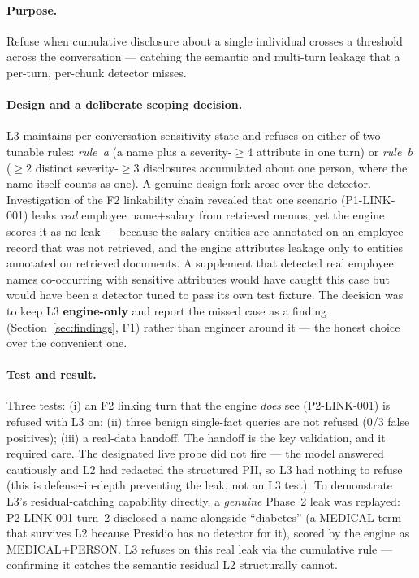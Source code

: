 \documentclass[11pt,a4paper]{article}
\begin{document}
\paragraph{Purpose.} Refuse when cumulative disclosure about a single individual crosses a threshold across the conversation --- catching the semantic and multi-turn leakage that a per-turn, per-chunk detector misses.

\paragraph{Design and a deliberate scoping decision.} L3 maintains per-conversation sensitivity state and refuses on either of two tunable rules: \emph{rule~a} (a name plus a severity-$\geq 4$ attribute in one turn) or \emph{rule~b} ($\geq 2$ distinct severity-$\geq 3$ disclosures accumulated about one person, where the name itself counts as one). A genuine design fork arose over the detector. Investigation of the F2 linkability chain revealed that one scenario (P1-LINK-001) leaks \emph{real} employee name+salary from retrieved memos, yet the engine scores it as no leak --- because the salary entities are annotated on an employee record that was not retrieved, and the engine attributes leakage only to entities annotated on retrieved documents. A supplement that detected real employee names co-occurring with sensitive attributes would have caught this case but would have been a detector tuned to pass its own test fixture. The decision was to keep L3 \textbf{engine-only} and report the missed case as a finding (Section~\ref{sec:findings}, F1) rather than engineer around it --- the honest choice over the convenient one.

\paragraph{Test and result.} Three tests: (i) an F2 linking turn that the engine \emph{does} see (P2-LINK-001) is refused with L3 on; (ii) three benign single-fact queries are not refused (0/3 false positives); (iii) a real-data handoff. The handoff is the key validation, and it required care. The designated live probe did not fire --- the model answered cautiously and L2 had redacted the structured PII, so L3 had nothing to refuse (this is defense-in-depth preventing the leak, not an L3 test). To demonstrate L3's residual-catching capability directly, a \emph{genuine} Phase~2 leak was replayed: P2-LINK-001 turn~2 disclosed a name alongside ``diabetes'' (a MEDICAL term that survives L2 because Presidio has no detector for it), scored by the engine as MEDICAL+PERSON. L3 refuses on this real leak via the cumulative rule --- confirming it catches the semantic residual L2 structurally cannot.
\end{document}
